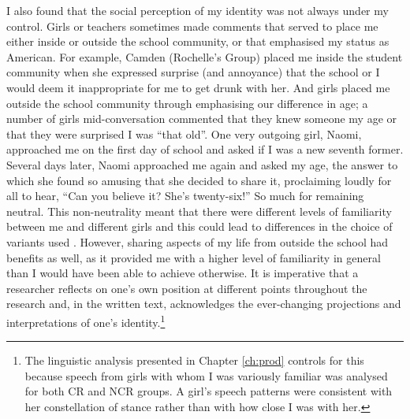 I also found that the social perception of my identity was not always under my control. Girls or teachers sometimes made comments that served to place me either inside or outside the school community, or that emphasised my status as American. For example, Camden (Rochelle's Group) placed me inside the student community when she expressed surprise (and annoyance) that the school or I would deem it inappropriate for me to get drunk with her. And girls placed me outside the school community through emphasising our difference in age; a number of girls mid-conversation commented that they knew someone my age or that they were surprised I was ``that old''. One very outgoing girl, Naomi, approached me on the first day of school and asked if I was a new seventh former. Several days later, Naomi approached me again and asked my age, the answer to which she found so amusing that she decided to share it, proclaiming loudly for all to hear, ``Can you believe it?  She's twenty-six!''  So much for remaining neutral. This non-neutrality meant that there were different levels of familiarity between me and different girls and this could lead to differences in the choice of variants used \citep{cukoravilabailey}. However, sharing aspects of my life from outside the school had benefits as well, as it provided me with a higher level of familiarity in general than I would have been able to achieve otherwise. It is imperative that a researcher reflects on one's own position at different points throughout the research and, in the written text, acknowledges the ever-changing projections and interpretations of one's identity.\footnote{The linguistic analysis presented in Chapter \ref{ch:prod} controls for this because speech from girls with whom I was variously familiar was analysed for both CR and NCR groups. A girl's speech patterns were consistent with her constellation of stance rather than with how close I was with her.}  





